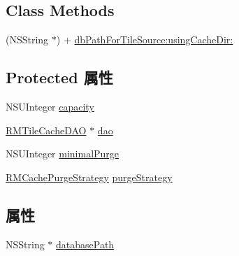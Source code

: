 \subsection*{Class Methods}
\begin{DoxyCompactItemize}
\item 
(N\-S\-String $\ast$) + \hyperlink{interface_r_m_database_cache_a18cf19019d86081e29c6b57a903daefc}{db\-Path\-For\-Tile\-Source\-:using\-Cache\-Dir\-:}
\end{DoxyCompactItemize}
\subsection*{Protected 属性}
\begin{DoxyCompactItemize}
\item 
N\-S\-U\-Integer \hyperlink{interface_r_m_database_cache_afa03a8db5ae9ce39dcdfaaf4950198d0}{capacity}
\item 
\hyperlink{interface_r_m_tile_cache_d_a_o}{R\-M\-Tile\-Cache\-D\-A\-O} $\ast$ \hyperlink{interface_r_m_database_cache_a155c655a0a18d7fa99bae05faa17765c}{dao}
\item 
N\-S\-U\-Integer \hyperlink{interface_r_m_database_cache_af53a420e2e3f29269c0845a60efa3856}{minimal\-Purge}
\item 
\hyperlink{_r_m_tile_cache_8h_a39a51990ae35e2dbc42369aa64ef43f4}{R\-M\-Cache\-Purge\-Strategy} \hyperlink{interface_r_m_database_cache_a9504fb13d6065ee7a3cd5b37f500921d}{purge\-Strategy}
\end{DoxyCompactItemize}
\subsection*{属性}
\begin{DoxyCompactItemize}
\item 
N\-S\-String $\ast$ \hyperlink{interface_r_m_database_cache_a7c19186ec63b382cae1348a92b266ee7}{database\-Path}
\end{DoxyCompactItemize}


